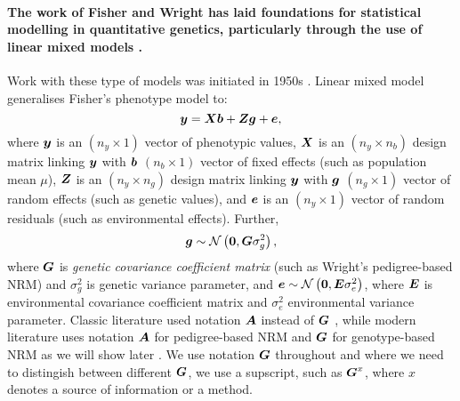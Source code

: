 \paragraph{The work of Fisher and Wright has laid foundations for
statistical modelling in quantitative genetics, particularly through the
use of linear mixed models
\citep{falconer1996introduction, henderson1984applications,
lynch1998genetics, mrode2023linear}.}
%
Work with these type of models was initiated in 1950s
\citep{henderson1959estimation, robinson1991that, gianola2015one}.
%
Linear mixed model generalises Fisher's phenotype model to:
%
\begin{equation} \label{eqn:fisher_pheno_mat}
  \boldsymbol{y} = \boldsymbol{Xb} + \boldsymbol{Zg} + \boldsymbol{e},
\end{equation}
%
where
$\boldsymbol{y}$ is an $(n_y \times 1)$ vector of phenotypic values,
$\boldsymbol{X}$ is an $(n_y \times n_b)$ design matrix linking $\boldsymbol{y}$ with
$\boldsymbol{b}$ $(n_b \times 1)$ vector of fixed effects (such as population mean $\mu$),
$\boldsymbol{Z}$ is an $(n_y \times n_g)$ design matrix linking $\boldsymbol{y}$ with
$\boldsymbol{g}$ $(n_g \times 1)$ vector of random effects (such as genetic values), and
$\boldsymbol{e}$ is an $(n_y \times 1)$ vector of random residuals (such as environmental effects).
%
Further,
%
\begin{equation} \label{eqn:g_normal}
  \boldsymbol{g} \sim \mathcal{N}\left(\boldsymbol{0}, \boldsymbol{G}\sigma_g^2\right),
\end{equation}
%
where
$\boldsymbol{G}$ is \textit{genetic covariance coefficient matrix}
(such as Wright's pedigree-based NRM) and
$\sigma_g^2$ is genetic variance parameter, and
$\boldsymbol{e} \sim \mathcal{N}\left(\boldsymbol{0}, \boldsymbol{E}\sigma_e^2\right)$,
where
$\boldsymbol{E}$ is environmental covariance coefficient matrix and
$\sigma_e^2$ environmental variance parameter.
%
Classic literature used notation $\boldsymbol{A}$ instead of $\boldsymbol{G}$
\citep{henderson1984applications},
while modern literature uses notation $\boldsymbol{A}$ for pedigree-based NRM
and $\boldsymbol{G}$ for genotype-based NRM as we will show later
\citep[e.g.][]{vanraden2008efficient, mrode2023linear}.
%
We use notation $\boldsymbol{G}$ throughout and where we need to distingish
between different $\boldsymbol{G}$, we use a supscript, such as $\boldsymbol{G}^{x}$,
where $x$ denotes a source of information or a method.

